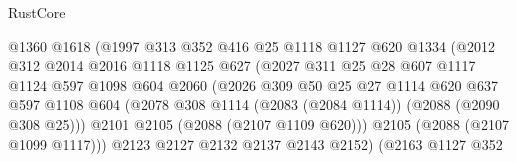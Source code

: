 \begin{lexlean}{RustCore}
\begin{coremodule}
                                @1360
                                @1618
                                (@1997
                                  @313
                                  @352
                                  @416
                                  @25
                                  @1118
                                  @1127
                                  @620
                                  @1334
                                  (@2012
                                    @312
                                    @2014
                                    @2016
                                    @1118
                                    @1125
                                    @627
                                    (@2027
                                      @311
                                      @25
                                      @28
                                      @607
                                      @1117
                                      @1124
                                      @597
                                      @1098
                                      @604
                                      @2060
                                      (@2026
                                        @309
                                        @50
                                        @25
                                        @27
                                        @1114
                                        @620
                                        @637
                                        @597
                                        @1108
                                        @604
                                        (@2078
                                          @308
                                          @1114
                                          (@2083 (@2084 @1114))
                                          (@2088 (@2090 @308 @25)))
                                        @2101
                                        @2105
                                        (@2088 (@2107 @1109 @620)))
                                      @2105
                                      (@2088 (@2107 @1099 @1117)))
                                    @2123
                                    @2127
                                    @2132
                                    @2137
                                    @2143
                                    @2152)
                                  (@2163
                                    @1127
                                    @352

\end{coremodule}
\end{lexlean}
